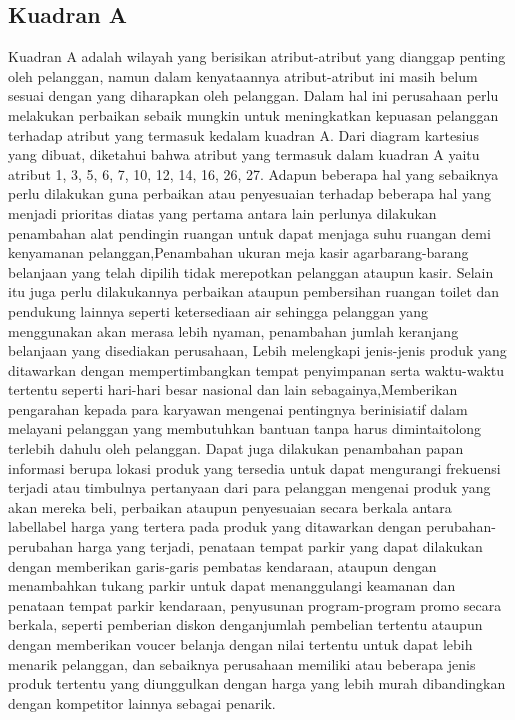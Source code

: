 \subsection{Kuadran A}
Kuadran A adalah wilayah yang berisikan atribut-atribut yang dianggap penting oleh pelanggan, namun dalam kenyataannya atribut-atribut ini masih belum sesuai
dengan yang diharapkan oleh pelanggan. Dalam hal ini perusahaan perlu melakukan perbaikan sebaik mungkin untuk meningkatkan kepuasan pelanggan terhadap
atribut yang termasuk kedalam kuadran A. Dari diagram kartesius yang dibuat, diketahui bahwa atribut yang termasuk dalam kuadran A yaitu atribut 1, 3, 5, 6, 7,
10, 12, 14, 16, 26, 27.
Adapun beberapa hal yang sebaiknya perlu dilakukan guna perbaikan atau penyesuaian terhadap beberapa hal yang menjadi  prioritas diatas yang pertama antara lain
perlunya dilakukan penambahan alat pendingin ruangan untuk dapat menjaga suhu ruangan demi kenyamanan pelanggan,Penambahan ukuran meja kasir agarbarang-barang belanjaan yang telah dipilih
tidak merepotkan pelanggan ataupun kasir. Selain itu juga perlu dilakukannya perbaikan ataupun pembersihan ruangan toilet dan pendukung lainnya seperti ketersediaan air
sehingga pelanggan yang menggunakan akan merasa lebih nyaman, penambahan jumlah keranjang belanjaan yang disediakan perusahaan, Lebih melengkapi jenis-jenis
produk yang ditawarkan dengan mempertimbangkan tempat penyimpanan serta waktu-waktu tertentu seperti hari-hari besar nasional dan lain sebagainya,Memberikan pengarahan kepada para
karyawan mengenai pentingnya berinisiatif dalam melayani pelanggan yang membutuhkan bantuan tanpa harus dimintaitolong terlebih dahulu oleh pelanggan.
Dapat juga dilakukan penambahan papan informasi berupa lokasi produk yang tersedia untuk dapat mengurangi frekuensi terjadi atau timbulnya pertanyaan dari para
pelanggan mengenai produk yang akan mereka beli, perbaikan ataupun penyesuaian secara berkala antara labellabel harga yang tertera pada produk yang ditawarkan dengan perubahan-perubahan
harga yang terjadi, penataan tempat parkir yang dapat dilakukan dengan memberikan garis-garis pembatas kendaraan, ataupun dengan menambahkan tukang parkir untuk
dapat menanggulangi keamanan dan penataan tempat parkir kendaraan, penyusunan program-program promo secara berkala, seperti pemberian diskon denganjumlah pembelian tertentu ataupun dengan
memberikan voucer belanja dengan nilai tertentu untuk dapat lebih menarik pelanggan, dan sebaiknya perusahaan memiliki atau beberapa jenis produk tertentu
yang diunggulkan dengan harga yang lebih murah dibandingkan dengan kompetitor lainnya sebagai penarik.
